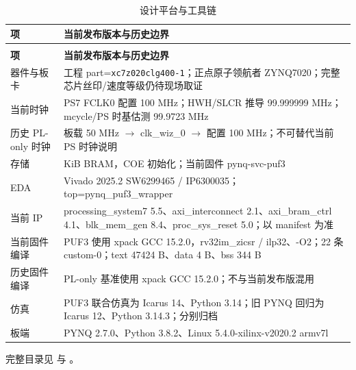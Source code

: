 {\small
\setlength{\tabcolsep}{4pt}
\renewcommand{\thetable}{2-19}
\begin{longtable}{@{}>{\raggedright\arraybackslash}p{}>{\raggedright\arraybackslash}p{}@{}}
\caption{设计平台与工具链}\label{tab:2-19}\\
\toprule
\textbf{项} & \textbf{当前发布版本与历史边界} \\
\midrule
\endfirsthead
\multicolumn{2}{@{}l}{\footnotesize 续表 2-19}\\
\toprule
\textbf{项} & \textbf{当前发布版本与历史边界} \\
\midrule
\endhead
器件与板卡 & 工程 part=\texttt{xc7z020clg400-\allowbreak{}1}；正点原子领航者 ZYNQ7020；完整芯片丝印/速度等级仍待现场取证 \\
当前时钟 & PS7 FCLK0 配置 100 MHz；HWH/SLCR 推导 99.999999 MHz；mcycle/PS 时基估测 99.9723 MHz \\
历史 PL-only 时钟 & 板载 50 MHz $\rightarrow$ clk\_\allowbreak{}wiz\_\allowbreak{}0 $\rightarrow$ 配置 100 MHz；不可替代当前 PS 时钟说明 \\
存储 & 128 KiB BRAM，COE 初始化；当前固件 pynq-svc-puf3 \\
EDA & Vivado 2025.2 SW6299465 / IP6300035；top=pynq\_puf3\_wrapper \\
当前 IP & processing\_\allowbreak{}system7 5.5、axi\_\allowbreak{}interconnect 2.1、axi\_\allowbreak{}bram\_\allowbreak{}ctrl 4.1、blk\_\allowbreak{}mem\_\allowbreak{}gen 8.4、proc\_\allowbreak{}sys\_\allowbreak{}reset 5.0；以 manifest 为准 \\
当前固件编译 & PUF3 使用 xpack GCC 15.2.0，rv32im\_zicsr / ilp32、-O2；22 条 custom-0；text 47424 B、data 4 B、bss 344 B \\
历史固件编译 & PL-only 基准使用 xpack GCC 15.2.0；不与当前发布版混用 \\
仿真 & PUF3 联合仿真为 Icarus 14、Python 3.14；旧 PYNQ 回归为 Icarus 12、Python 3.14.3；分别归档 \\
板端 & PYNQ 2.7.0、Python 3.8.2、Linux 5.\allowbreak{}4.\allowbreak{}0-\allowbreak{}xilinx-\allowbreak{}v2020.\allowbreak{}2 armv7l \\
\bottomrule
\end{longtable}
}

完整目录见 \pufcandidate 与 \pufresult。

\Needspace{85pt}

